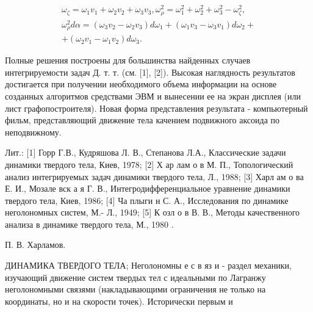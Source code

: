 \documentclass[10pt]{article}
\begin{document}
\[

\begin{gathered}

\omega_{\zeta}=\omega_{1} v_{1}+\omega_{2} v_{2}+\omega_{3} v_{3}, \omega_{\rho}^{2}=\omega_{1}^{2}+\omega_{2}^{2}+\omega_{3}^{2}-\omega_{\zeta}^{2}, \\

\omega_{\rho}^{2} d \alpha=\left(\omega_{3} v_{2}-\omega_{2} v_{3}\right) d \omega_{1}+\left(\omega_{1} v_{3}-\omega_{3} v_{1}\right) d \omega_{2}+ \\

+\left(\omega_{2} v_{1}-\omega_{1} v_{2}\right) d \omega_{3} .

\end{gathered}

\]



Полные решения построены для большинства найденных случаев интегрируемости задач Д. т. т. (см. [1], [2]). Высокая наглядность результатов достигается при получении необходимого объема информации на основе созданных алгоритмов средствами ЭВМ и вынесении ее на экран дисплея (или лист графопостроителя). Новая форма представления результата - компьютерный фильм, представляющий движение тела качением подвижного аксоида по неподвижному.



Лит.: [1] Горр Г.В., Кудряшова Л. В., Степанова Л.А., Классические задачи динамики твердого тела, Киев, 1978; [2] Х ар лам о в М. П., Топологический анализ интегрируемых задач динамики твердого тела, Л., 1988; [3] Харл ам о ва Е. И., Мозале вск а я Г. В., Интегродифференциальное уравнение динамики твердого тела, Киев, 1986; [4] Ча плыги н С. А., Исследования по динамике неголономных систем, М.- Л., 1949; [5] К озл о в В. В., Методы качественного анализа в динамике твердого тела, М., 1980 .



П. В. Харламов.



ДИНАМИКА ТВЕРДОГО ТЕЛА; Неголономны е с в яз и - раздел механики, изучающий движение систем твердых тел с идеальными по Лагранжу неголономными связями (накладывающими ограничения не только на координаты, но и на скорости точек). Исторически первым и
\end{document}
